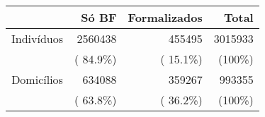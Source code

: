 \begin{tabular}{crr|r}
\toprule
 & S\'o BF & Formalizados & Total \\
\midrule
Indiv\'iduos & 2560438 & 455495 & 3015933 \\
 & (     84.9\%) & (     15.1\%) & (100\%) \\
Domic\'ilios & 634088 & 359267 & 993355 \\
 & (     63.8\%) & (     36.2\%) & (100\%) \\
\bottomrule
\end{tabular}
